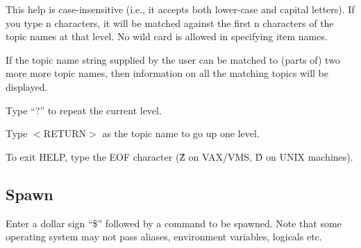 \documentclass[11pt]{article}
\begin{document}
This help is case-insensitive  (i.e., it accepts both lower-case and capital
letters).   If you type n characters,  it will be matched against  the first
n characters of  the topic names at that level.   No wild card is allowed in
specifying item names.

If the topic name
string supplied by the user  can be matched to (parts of) two more more
topic names, then information on all the matching topics will be displayed.

Type ``?'' to repeat the current level.

Type $<$RETURN$>$ as the topic name to go up one level.

To exit HELP, type the EOF character (\^Z on VAX/VMS, \^D on UNIX machines).

\subsection{Spawn}

Enter a dollar sign ``\$'' followed by a command to be spawned.  Note that some
operating system may not pass aliases, environment variables, logicals etc.

\pagebreak
\end{document}
